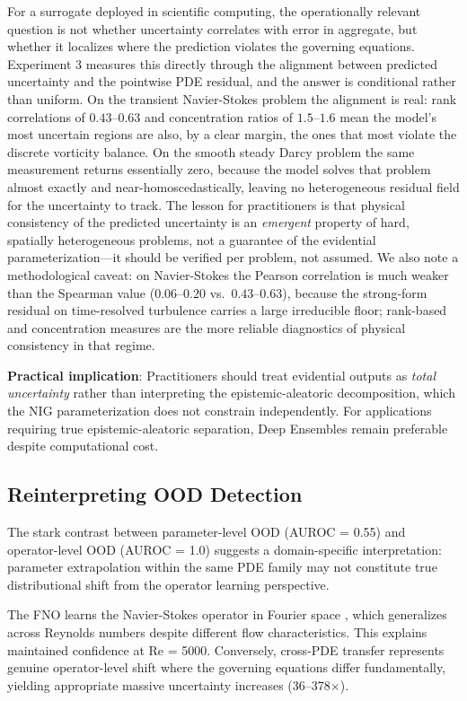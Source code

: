 For a surrogate deployed in scientific computing, the operationally relevant question is not whether
uncertainty correlates with error in aggregate, but whether it localizes where the prediction violates the
governing equations. Experiment 3 measures this directly through the alignment between predicted uncertainty
and the pointwise PDE residual, and the answer is conditional rather than uniform. On the transient
Navier-Stokes problem the alignment is real: rank correlations of $0.43$--$0.63$ and concentration ratios of
$1.5$--$1.6$ mean the model's most uncertain regions are also, by a clear margin, the ones that most violate
the discrete vorticity balance. On the smooth steady Darcy problem the same measurement returns essentially
zero, because the model solves that problem almost exactly and near-homoscedastically, leaving no
heterogeneous residual field for the uncertainty to track. The lesson for practitioners is that physical
consistency of the predicted uncertainty is an \emph{emergent} property of hard, spatially heterogeneous
problems, not a guarantee of the evidential parameterization---it should be verified per problem, not
assumed. We also note a methodological caveat: on Navier-Stokes the Pearson correlation is much weaker than
the Spearman value ($0.06$--$0.20$ vs.\ $0.43$--$0.63$), because the strong-form residual on time-resolved
turbulence carries a large irreducible floor; rank-based and concentration measures are the more reliable
diagnostics of physical consistency in that regime.

\textbf{Practical implication}: Practitioners should treat evidential outputs as \emph{total uncertainty}
rather than interpreting the epistemic-aleatoric decomposition, which the NIG parameterization does not
constrain independently. For applications requiring true epistemic-aleatoric separation, Deep Ensembles
remain preferable despite computational cost.

\subsection{Reinterpreting OOD Detection}

The stark contrast between parameter-level OOD (AUROC = 0.55) and operator-level OOD (AUROC = 1.0) suggests a 
domain-specific interpretation: parameter extrapolation within the same PDE family may not constitute true 
distributional shift from the operator learning perspective.

The FNO learns the Navier-Stokes operator in Fourier space \cite{li2020fourier,kovachki2023neural}, which
generalizes across Reynolds numbers despite different flow characteristics. This explains maintained confidence at Re = 5000. Conversely, cross-PDE transfer 
represents genuine operator-level shift where the governing equations differ fundamentally, yielding appropriate 
massive uncertainty increases (36--378$\times$).

